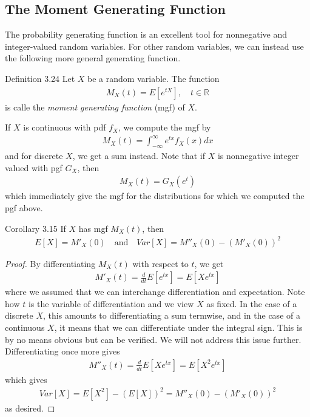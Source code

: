 \subsection{The Moment Generating Function}
The probability generating function is an excellent tool for nonnegative and integer-valued random variables.
For other random variables, we can instead use the following more general generating function.

\begin{boks}{Definition 3.24}
  Let $X$ be a random variable. The function
  \begin{align*}
    M_X(t) = E[e^{tX}], \quad t \in \mathbb{R}
  \end{align*}
  is calle the \textit{moment generating function} (mgf) of $X$.
\end{boks}

If $X$ is continuous with pdf $f_X$, we compute the mgf by
\begin{align*}
  M_X(t) = \int_{-\infty}^\infty e^{tx} f_X(x)dx
\end{align*}
and for discrete $X$, we get a sum instead. Note that if $X$ is nonnegative integer valued with pgf $G_X$, then
\begin{align*}
  M_X(t) = G_X(e^t)
\end{align*}
which immediately give the mgf for the distributions for which we computed the pgf above.

\begin{boks}{Corollary 3.15}
  If $X$ has mgf $M_X(t)$, then
  \begin{align*}
    E[X] = M'_X(0) \quad \text{and} \quad Var[X] = M''_X(0) - (M'_X(0))^2
  \end{align*}
\end{boks}

\begin{proof}
  By differentiating $M_X(t)$ with respect to $t$, we get
  \begin{align*}
    M'_X(t) = \frac{d}{dt}E[e^{tx}] = E[Xe^{tx}]
  \end{align*}
  where we assumed that we can interchange differentiation and expectation.
  Note how $t$ is the variable of differentiation and we view $X$ as fixed.
  In the case of a discrete $X$, this amounts to differentiating a sum termwise, and in the case of a continuous $X$, it means that we can differentiate under the integral sign.
  This is by no means obvious but can be verified.
  We will not address this issue further.
  Differentiating once more gives
  \begin{align*}
    M''_X(t) = \frac{d}{dt} E[Xe^{tx}] = E[X^2e^{tx}]
  \end{align*}
  which gives
  \begin{align*}
    Var[X] = E[X^2] - (E[X])^2 = M''_X(0) - (M'_X(0))^2
  \end{align*}
  as desired.
\end{proof}

